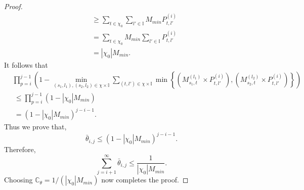 \documentclass[opre,sglanonrev]{informs4}
\numberwithin{equation}{section}
\newcommand{\pow}[1]{^{(#1)}}
\newcommand{\lp}{\left(}
\newcommand{\rp}{\right)}
\newcommand{\lc}{\left\{}
\newcommand{\rc}{\right\}}
\newcommand{\Cbb}{\mathbb{C}}
\newcommand{\Ibb}{\mathbb{I}}
\newcommand{\constant}{\Cbb}
\begin{document}
\begin{APPENDICES}
\begin{proof}
\begin{align*}
    & \geq \sum_{t\in\chi_0}\sum_{l'\in \Ibb}  M_{min} P_{t,l'}\pow{i}\\
    & = \sum_{t\in\chi_0}M_{min}\sum_{l'\in \Ibb}P_{t,l'}\pow{i} \\
    & = |\chi_0|M_{min}.
\end{align*}
It follows that
\begin{align*}
    & \prod_{p=i}^{j-1}\lp 1-\min_{(s_1,l_1),(s_2,l_2)\in\chi\times\Ibb}\sum_{(t,l')\in \chi\times\Ibb} \min\lc \lp M_{s_1,t}^{(l_1)}\times P_{t,l'}\pow{i}\rp,\lp M_{s_2,t}^{(l_2)}\times P_{t,l'}\pow{i}\rp \rc\rp \\
    &\ \leq  \prod_{p=i}^{j-1}\lp 1-|\chi_0|M_{min}\rp\\
    &\ = \lp1-|\chi_0|M_{min}\rp^{j-i-1}.
\end{align*}
Thus we prove that,
\[
\bar\theta_{i,j} \leq \lp1-|\chi_0|M_{min}\rp^{j-i-1}.
\]
Therefore, 
\[
\sum_{j=i+1}^{\infty}\bar\theta_{i,j}\leq \frac{1}{|\chi_0|M_{min}}.
\]
Choosing $\constant_\theta=1/(|\chi_0|M_{min})$ now completes the proof.
\end{proof}

\end{APPENDICES}
\end{document}
